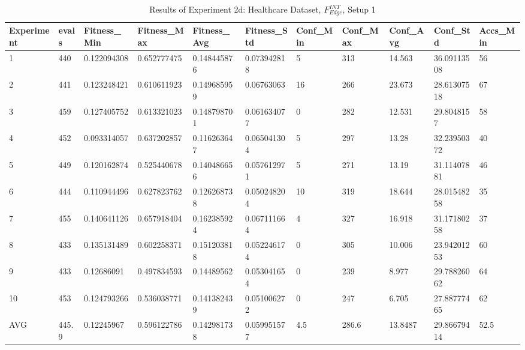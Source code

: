 		\begin{table}[H]
			\caption{Results of Experiment 2d: Healthcare Dataset, $F_{Edge}^{INT}$, Setup 1}
			\label{tab:A_Exp2d_Data}
			\begin{adjustbox}{max width=380pt,keepaspectratio,angle=90}
				\begin{tabular}{|l|l|l|l|l|l|l|l|l|l|l|}
					\rowcolor[HTML]{EFEFEF} 
					\hline
					Experiment & evals & Fitness\_Min & Fitness\_Max & Fitness\_Avg & Fitness\_Std & Conf\_Min & Conf\_Max & Conf\_Avg & Conf\_Std   & Accs\_Min \\ \hline
					1          & 440   & 0.122094308  & 0.652777475  & 0.148445876  & 0.073942818  & 5         & 313       & 14.563    & 36.09113508 & 56        \\ \hline
					2          & 441   & 0.123248421  & 0.610611923  & 0.149685959  & 0.06763063   & 16        & 266       & 23.673    & 28.61307518 & 67        \\ \hline
					3          & 459   & 0.127405752  & 0.613321023  & 0.148798701  & 0.061634077  & 0         & 282       & 12.531    & 29.8048157  & 58        \\ \hline
					4          & 452   & 0.093314057  & 0.637202857  & 0.116263647  & 0.065041304  & 5         & 297       & 13.28     & 32.23950372 & 40        \\ \hline
					5          & 449   & 0.120162874  & 0.525440678  & 0.140486656  & 0.057612971  & 5         & 271       & 13.19     & 31.11407881 & 46        \\ \hline
					6          & 444   & 0.110944496  & 0.627823762  & 0.126268738  & 0.050248204  & 10        & 319       & 18.644    & 28.01548258 & 35        \\ \hline
					7          & 455   & 0.140641126  & 0.657918404  & 0.162385924  & 0.067111664  & 4         & 327       & 16.918    & 31.17180258 & 37        \\ \hline
					8          & 433   & 0.135131489  & 0.602258371  & 0.151203818  & 0.052246174  & 0         & 305       & 10.006    & 23.94201253 & 60        \\ \hline
					9          & 433   & 0.12686091   & 0.497834593  & 0.14489562   & 0.053041654  & 0         & 239       & 8.977     & 29.78826062 & 64        \\ \hline
					10         & 453   & 0.124793266  & 0.536038771  & 0.141382439  & 0.051006272  & 0         & 247       & 6.705     & 27.88777465 & 62        \\ \hline\hline
					AVG        & 445.9 & 0.12245967   & 0.596122786  & 0.142981738  & 0.059951577  & 4.5       & 286.6     & 13.8487   & 29.86679414 & 52.5      \\ \hline

\end{tabular}
\end{adjustbox}
\end{table}
